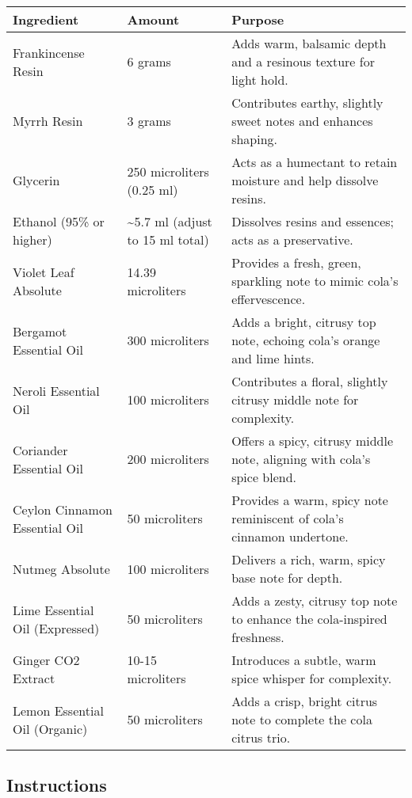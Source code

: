 \documentclass{article}
\begin{document}
\begin{center}
\begin{tabular}{p{4.5cm} p{2.5cm} p{8cm}}
\toprule
\textbf{Ingredient} & \textbf{Amount} & \textbf{Purpose} \\
\midrule
Frankincense Resin & 6 grams & Adds warm, balsamic depth and a resinous texture for light hold. \\
Myrrh Resin & 3 grams & Contributes earthy, slightly sweet notes and enhances shaping. \\
Glycerin & 250 microliters (0.25 ml) & Acts as a humectant to retain moisture and help dissolve resins. \\
Ethanol (95\% or higher) & \textasciitilde{}5.7 ml (adjust to 15 ml total) & Dissolves resins and essences; acts as a preservative. \\
Violet Leaf Absolute & 14.39 microliters & Provides a fresh, green, sparkling note to mimic cola's effervescence. \\
Bergamot Essential Oil & 300 microliters & Adds a bright, citrusy top note, echoing cola's orange and lime hints. \\
Neroli Essential Oil & 100 microliters & Contributes a floral, slightly citrusy middle note for complexity. \\
Coriander Essential Oil & 200 microliters & Offers a spicy, citrusy middle note, aligning with cola's spice blend. \\
Ceylon Cinnamon Essential Oil & 50 microliters & Provides a warm, spicy note reminiscent of cola's cinnamon undertone. \\
Nutmeg Absolute & 100 microliters & Delivers a rich, warm, spicy base note for depth. \\
Lime Essential Oil (Expressed) & 50 microliters & Adds a zesty, citrusy top note to enhance the cola-inspired freshness. \\
Ginger CO2 Extract & 10-15 microliters & Introduces a subtle, warm spice whisper for complexity. \\
Lemon Essential Oil (Organic) & 50 microliters & Adds a crisp, bright citrus note to complete the cola citrus trio. \\
\bottomrule
\end{tabular}
\end{center}

\subsection*{Instructions}
\end{document}
